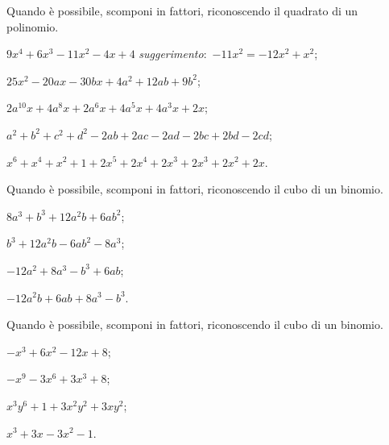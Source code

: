 \begin{esercizio}
\label{ese:13.50}
Quando è possibile, scomponi in fattori, riconoscendo il quadrato di un polinomio.
\begin{enumeratea}
 \item $9x^{4}+6x^{3}-11x^{2}-4x+4$ \quad \emph{suggerimento}:~$-11x^{2}=-12x^{2}+x^{2}$;
 \item $25x^{2}-20ax-30bx+4a^{2}+12ab+9b^{2}$;
 \item $2a^{10}x+4a^{8}x+2a^{6}x+4a^{5}x+4a^{3}x+2x$;
 \item $a^{2}+b^{2}+c^{2}+d^{2}-2ab+2ac-2ad-2bc+2bd-2cd$;
 \item $x^{6}+x^{4}+x^{2}+1+2x^{5}+2x^{4}+2x^{3}+2x^{3}+2x^{2}+2x$.
\end{enumeratea}
\end{esercizio}
\pagebreak
\begin{esercizio}
\label{ese:13.51}
Quando è possibile, scomponi in fattori, riconoscendo il cubo di un binomio.
\begin{multicols}{2}
\begin{enumeratea}
 \item $8a^{3}+b^{3}+12a^{2}b+6ab^{2}$;
 \item $b^{3}+12a^{2}b-6ab^{2}-8a^{3}$;
 \item $-12a^{2}+8a^{3}-b^{3}+6ab$;
 \item $-12a^{2}b+6ab+8a^{3}-b^{3}$.
\end{enumeratea}
\end{multicols}
\end{esercizio}

\begin{esercizio}
\label{ese:13.52}
Quando è possibile, scomponi in fattori, riconoscendo il cubo di un binomio.
\begin{multicols}{2}
\begin{enumeratea}
 \item $-x^{3}+6x^{2}-12x+8$;
 \item $-x^{9}-3x^{6}+3x^{3}+8$;
 \item $x^{3}y^{6}+1+3x^{2}y^{2}+3xy^{2}$;
 \item $x^{3}+3x-3x^{2}-1$.
\end{enumeratea}
\end{multicols}
\end{esercizio}

